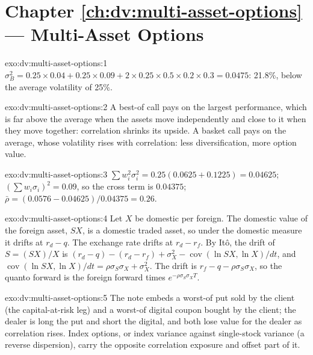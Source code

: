\section*{Chapter \ref{ch:dv:multi-asset-options} --- Multi-Asset Options}

\begin{solution}{exo:dv:multi-asset-options:1}
$\sigma_B^2=0.25\times0.04+0.25\times0.09+2\times0.25\times0.5\times0.2\times0.3=0.0475$: 21.8\%, below the average volatility of
25\%.
\end{solution}

\begin{solution}{exo:dv:multi-asset-options:2}
A best-of call pays on the largest performance, which is far above the average when the assets move independently and close to
it when they move together: correlation shrinks its upside. A basket call pays on the average, whose volatility rises with
correlation: less diversification, more option value.
\end{solution}

\begin{solution}{exo:dv:multi-asset-options:3}
$\sum w_i^2\sigma_i^2=0.25(0.0625+0.1225)=0.04625$; $(\sum w_i\sigma_i)^2=0.09$, so the cross term is $0.04375$;
$\bar\rho=(0.0576-0.04625)/0.04375=0.26$.
\end{solution}

\begin{solution}{exo:dv:multi-asset-options:4}
Let $X$ be domestic per foreign. The domestic value of the foreign asset, $SX$, is a domestic traded asset, so under the domestic
measure it drifts at $r_d-q$. The exchange rate drifts at $r_d-r_f$. By Itô, the drift of $S=(SX)/X$ is
$(r_d-q)-(r_d-r_f)+\sigma_X^2-\operatorname{cov}(\ln SX,\ln X)/dt$, and
$\operatorname{cov}(\ln SX,\ln X)/dt=\rho\sigma_S\sigma_X+\sigma_X^2$. The drift is $r_f-q-\rho\sigma_S\sigma_X$, so the quanto
forward is the foreign forward times $e^{-\rho\sigma_S\sigma_XT}$.
\end{solution}

\begin{solution}{exo:dv:multi-asset-options:5}
The note embeds a worst-of put sold by the client (the capital-at-risk leg) and a worst-of digital coupon bought by the client;
the dealer is long the put and short the digital, and both lose value for the dealer as correlation rises. Index options, or
index variance against single-stock variance (a reverse dispersion), carry the opposite correlation exposure and offset part of
it.
\end{solution}

